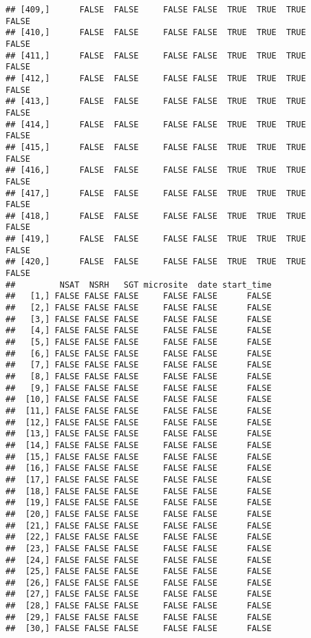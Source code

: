 \documentclass[
]{article}
\begin{document}
\begin{verbatim}
## [409,]      FALSE  FALSE     FALSE FALSE  TRUE  TRUE  TRUE         FALSE
## [410,]      FALSE  FALSE     FALSE FALSE  TRUE  TRUE  TRUE         FALSE
## [411,]      FALSE  FALSE     FALSE FALSE  TRUE  TRUE  TRUE         FALSE
## [412,]      FALSE  FALSE     FALSE FALSE  TRUE  TRUE  TRUE         FALSE
## [413,]      FALSE  FALSE     FALSE FALSE  TRUE  TRUE  TRUE         FALSE
## [414,]      FALSE  FALSE     FALSE FALSE  TRUE  TRUE  TRUE         FALSE
## [415,]      FALSE  FALSE     FALSE FALSE  TRUE  TRUE  TRUE         FALSE
## [416,]      FALSE  FALSE     FALSE FALSE  TRUE  TRUE  TRUE         FALSE
## [417,]      FALSE  FALSE     FALSE FALSE  TRUE  TRUE  TRUE         FALSE
## [418,]      FALSE  FALSE     FALSE FALSE  TRUE  TRUE  TRUE         FALSE
## [419,]      FALSE  FALSE     FALSE FALSE  TRUE  TRUE  TRUE         FALSE
## [420,]      FALSE  FALSE     FALSE FALSE  TRUE  TRUE  TRUE         FALSE
##         NSAT  NSRH   SGT microsite  date start_time
##   [1,] FALSE FALSE FALSE     FALSE FALSE      FALSE
##   [2,] FALSE FALSE FALSE     FALSE FALSE      FALSE
##   [3,] FALSE FALSE FALSE     FALSE FALSE      FALSE
##   [4,] FALSE FALSE FALSE     FALSE FALSE      FALSE
##   [5,] FALSE FALSE FALSE     FALSE FALSE      FALSE
##   [6,] FALSE FALSE FALSE     FALSE FALSE      FALSE
##   [7,] FALSE FALSE FALSE     FALSE FALSE      FALSE
##   [8,] FALSE FALSE FALSE     FALSE FALSE      FALSE
##   [9,] FALSE FALSE FALSE     FALSE FALSE      FALSE
##  [10,] FALSE FALSE FALSE     FALSE FALSE      FALSE
##  [11,] FALSE FALSE FALSE     FALSE FALSE      FALSE
##  [12,] FALSE FALSE FALSE     FALSE FALSE      FALSE
##  [13,] FALSE FALSE FALSE     FALSE FALSE      FALSE
##  [14,] FALSE FALSE FALSE     FALSE FALSE      FALSE
##  [15,] FALSE FALSE FALSE     FALSE FALSE      FALSE
##  [16,] FALSE FALSE FALSE     FALSE FALSE      FALSE
##  [17,] FALSE FALSE FALSE     FALSE FALSE      FALSE
##  [18,] FALSE FALSE FALSE     FALSE FALSE      FALSE
##  [19,] FALSE FALSE FALSE     FALSE FALSE      FALSE
##  [20,] FALSE FALSE FALSE     FALSE FALSE      FALSE
##  [21,] FALSE FALSE FALSE     FALSE FALSE      FALSE
##  [22,] FALSE FALSE FALSE     FALSE FALSE      FALSE
##  [23,] FALSE FALSE FALSE     FALSE FALSE      FALSE
##  [24,] FALSE FALSE FALSE     FALSE FALSE      FALSE
##  [25,] FALSE FALSE FALSE     FALSE FALSE      FALSE
##  [26,] FALSE FALSE FALSE     FALSE FALSE      FALSE
##  [27,] FALSE FALSE FALSE     FALSE FALSE      FALSE
##  [28,] FALSE FALSE FALSE     FALSE FALSE      FALSE
##  [29,] FALSE FALSE FALSE     FALSE FALSE      FALSE
##  [30,] FALSE FALSE FALSE     FALSE FALSE      FALSE

\end{verbatim}
\end{document}
